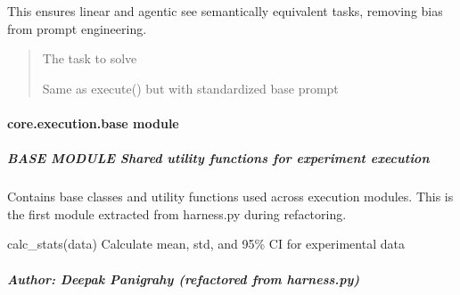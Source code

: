 \documentclass[letterpaper,10pt,english]{sphinxmanual}
\begin{document}
\begin{fulllineitems}
\begin{fulllineitems}
\sphinxAtStartPar
This ensures linear and agentic see semantically equivalent tasks,
removing bias from prompt engineering.
\begin{quote}\begin{description}
\sphinxAtStartPar
{} \textendash{} The task to solve

\sphinxAtStartPar
Same as execute() but with standardized base prompt

\end{description}\end{quote}

\end{fulllineitems}


\end{fulllineitems}


\sphinxstepscope


\paragraph{core.execution.base module}
\label{\detokenize{core.execution.base:module-core.execution.base}}\label{\detokenize{core.execution.base:core-execution-base-module}}\label{\detokenize{core.execution.base::doc}}

\subparagraph{BASE MODULE \textendash{} Shared utility functions for experiment execution}
\label{\detokenize{core.execution.base:base-module-shared-utility-functions-for-experiment-execution}}\begin{description}
\sphinxAtStartPar
Contains base classes and utility functions used across execution modules.
This is the first module extracted from harness.py during refactoring.

\sphinxAtStartPar
calc\_stats(data) \textendash{} Calculate mean, std, and 95\% CI for experimental data

\end{description}


\subparagraph{Author: Deepak Panigrahy (refactored from harness.py)}
\label{\detokenize{core.execution.base:author-deepak-panigrahy-refactored-from-harness-py}}
\end{document}
